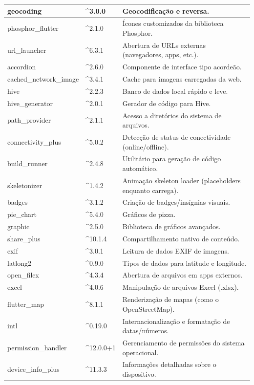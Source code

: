 \begin{table}[H]
\begin{tabular}{|p{4cm}|p{2.5cm}|p{8cm}|}
    geocoding & \^{}3.0.0 & Geocodificação e reversa. \\ \hline
    phosphor\_flutter & \^{}2.1.0 & Ícones customizados da biblioteca Phosphor. \\ \hline
    url\_launcher & \^{}6.3.1 & Abertura de URLs externas (navegadores, apps, etc.). \\ \hline
    accordion & \^{}2.6.0 & Componente de interface tipo acordeão. \\ \hline
    cached\_network\_image & \^{}3.4.1 & Cache para imagens carregadas da web. \\ \hline
    hive & \^{}2.2.3 & Banco de dados local rápido e leve. \\ \hline
    hive\_generator & \^{}2.0.1 & Gerador de código para Hive. \\ \hline
    path\_provider & \^{}2.1.1 & Acesso a diretórios do sistema de arquivos. \\ \hline
    connectivity\_plus & \^{}5.0.2 & Detecção de status de conectividade (online/offline). \\ \hline
    build\_runner & \^{}2.4.8 & Utilitário para geração de código automático. \\ \hline
    skeletonizer & \^{}1.4.2 & Animação skeleton loader (placeholders enquanto carrega). \\ \hline
    badges & \^{}3.1.2 & Criação de badges/insígnias visuais. \\ \hline
    pie\_chart & \^{}5.4.0 & Gráficos de pizza. \\ \hline
    graphic & \^{}2.5.0 & Biblioteca de gráficos avançados. \\ \hline
    share\_plus & \^{}10.1.4 & Compartilhamento nativo de conteúdo. \\ \hline
    exif & \^{}3.0.1 & Leitura de dados EXIF de imagens. \\ \hline
    latlong2 & \^{}0.9.0 & Tipos de dados para latitude e longitude. \\ \hline
    open\_filex & \^{}4.3.4 & Abertura de arquivos em apps externos. \\ \hline
    excel & \^{}4.0.6 & Manipulação de arquivos Excel (.xlsx). \\ \hline
    flutter\_map & \^{}8.1.1 & Renderização de mapas (como o OpenStreetMap). \\ \hline
    intl & \^{}0.19.0 & Internacionalização e formatação de datas/números. \\ \hline
    permission\_handler & \^{}12.0.0+1 & Gerenciamento de permissões do sistema operacional. \\ \hline
    device\_info\_plus & \^{}11.3.3 & Informações detalhadas sobre o dispositivo. \\ \hline
    \end{tabular}
    \label{tab:dependencias_flutter}
\end{table}
    

